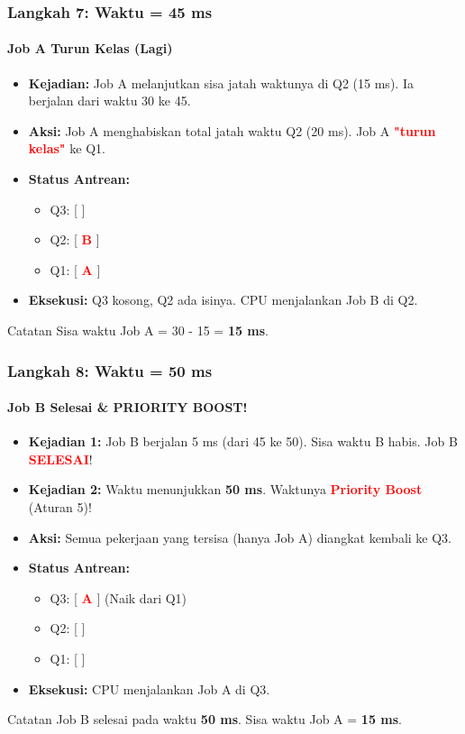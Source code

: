 \documentclass[t,aspectratio=169,xcolor=dvipsnames]{beamer}
\newcommand{\tem}[1]{\textbf{\textcolor{red}{#1}}}
\begin{document}
\begin{frame}
    \frametitle{Langkah 7: Waktu = 45 ms}
    \framesubtitle{Job A Turun Kelas (Lagi)}
    \small
    \begin{itemize}
        \item \textbf{Kejadian:} Job A melanjutkan sisa jatah waktunya di Q2 (15 ms). Ia berjalan dari waktu 30 ke 45.
        \item \textbf{Aksi:} Job A menghabiskan total jatah waktu Q2 (20 ms). Job A \tem{"turun kelas"} ke Q1.
        \item \textbf{Status Antrean:}
        \begin{itemize}
            \item Q3: [ ]
            \item Q2: [ \tem{B} ]
            \item Q1: [ \tem{A} ]
        \end{itemize}
        \item \textbf{Eksekusi:} Q3 kosong, Q2 ada isinya. CPU menjalankan Job B di Q2.
    \end{itemize}
    \vspace{0.3cm}
    \begin{exampleblock}{Catatan}
        Sisa waktu Job A = 30 - 15 = \textbf{15 ms}.
    \end{exampleblock}
\end{frame}

\begin{frame}
    \frametitle{Langkah 8: Waktu = 50 ms}
    \framesubtitle{Job B Selesai \& PRIORITY BOOST!}
    \small
    \begin{itemize}
        \item \textbf{Kejadian 1:} Job B berjalan 5 ms (dari 45 ke 50). Sisa waktu B habis. Job B \tem{SELESAI}!
        \item \textbf{Kejadian 2:} Waktu menunjukkan \textbf{50 ms}. Waktunya \tem{Priority Boost} (Aturan 5)!
        \item \textbf{Aksi:} Semua pekerjaan yang tersisa (hanya Job A) diangkat kembali ke Q3.
        \item \textbf{Status Antrean:}
        \begin{itemize}
            \item Q3: [ \tem{A} ] (Naik dari Q1)
            \item Q2: [ ]
            \item Q1: [ ]
        \end{itemize}
        \item \textbf{Eksekusi:} CPU menjalankan Job A di Q3.
    \end{itemize}
    \vspace{0.3cm}
    \begin{exampleblock}{Catatan}
        Job B selesai pada waktu \textbf{50 ms}. Sisa waktu Job A = \textbf{15 ms}.
    \end{exampleblock}
\end{frame}
\end{document}

